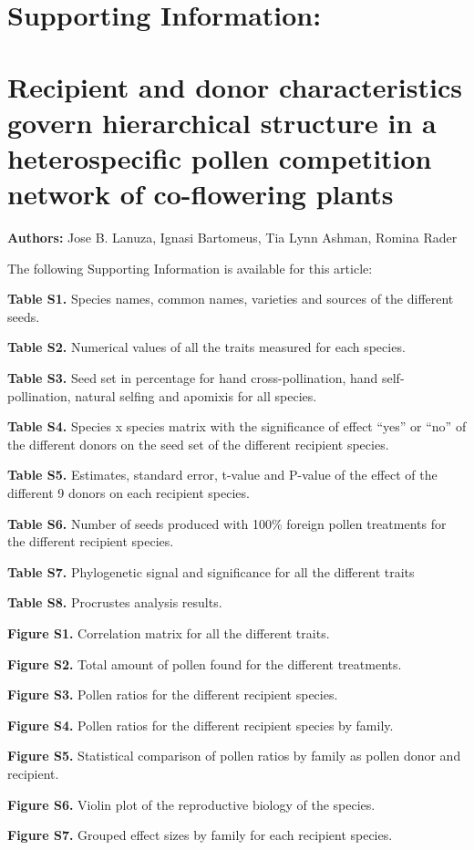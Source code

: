\documentclass[12pt,]{article}
\author{}
\date{\vspace{-2.5em}}
\begin{document}
\section{Supporting Information:}\label{supporting-information}

\section{Recipient and donor characteristics govern hierarchical
structure in a heterospecific pollen competition network of co-flowering
plants}\label{recipient-and-donor-characteristics-govern-hierarchical-structure-in-a-heterospecific-pollen-competition-network-of-co-flowering-plants}

\textbf{Authors:} Jose B. Lanuza, Ignasi Bartomeus, Tia Lynn Ashman,
Romina Rader

The following Supporting Information is available for this article:

\textbf{Table S1.} Species names, common names, varieties and sources of
the different seeds.

\textbf{Table S2.} Numerical values of all the traits measured for each
species.

\textbf{Table S3.} Seed set in percentage for hand cross-pollination,
hand self-pollination, natural selfing and apomixis for all species.

\textbf{Table S4.} Species x species matrix with the significance of
effect ``yes'' or ``no'' of the different donors on the seed set of the
different recipient species.

\textbf{Table S5.} Estimates, standard error, t-value and P-value of the
effect of the different 9 donors on each recipient species.

\textbf{Table S6.} Number of seeds produced with 100\% foreign pollen
treatments for the different recipient species.

\textbf{Table S7.} Phylogenetic signal and significance for all the
different traits

\textbf{Table S8.} Procrustes analysis results.

\textbf{Figure S1.} Correlation matrix for all the different traits.

\textbf{Figure S2.} Total amount of pollen found for the different
treatments.

\textbf{Figure S3.} Pollen ratios for the different recipient species.

\textbf{Figure S4.} Pollen ratios for the different recipient species by
family.

\textbf{Figure S5.} Statistical comparison of pollen ratios by family as
pollen donor and recipient.

\textbf{Figure S6.} Violin plot of the reproductive biology of the
species.

\textbf{Figure S7.} Grouped effect sizes by family for each recipient
species.
\end{document}
